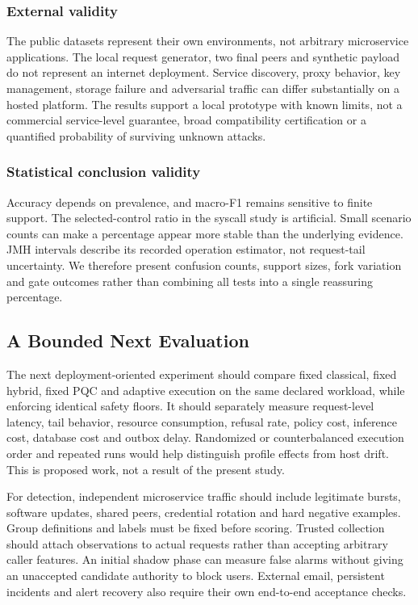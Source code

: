 \documentclass[conference,a4paper]{IEEEtran}
\begin{document}
\subsubsection{External validity}
The public datasets represent their own environments, not arbitrary microservice applications. The local request generator, two final peers and synthetic payload do not represent an internet deployment. Service discovery, proxy behavior, key management, storage failure and adversarial traffic can differ substantially on a hosted platform. The results support a local prototype with known limits, not a commercial service-level guarantee, broad compatibility certification or a quantified probability of surviving unknown attacks.

\subsubsection{Statistical conclusion validity}
Accuracy depends on prevalence, and macro-F1 remains sensitive to finite support. The selected-control ratio in the syscall study is artificial. Small scenario counts can make a percentage appear more stable than the underlying evidence. JMH intervals describe its recorded operation estimator, not request-tail uncertainty. We therefore present confusion counts, support sizes, fork variation and gate outcomes rather than combining all tests into a single reassuring percentage.

\subsection{A Bounded Next Evaluation}
The next deployment-oriented experiment should compare fixed classical, fixed hybrid, fixed PQC and adaptive execution on the same declared workload, while enforcing identical safety floors. It should separately measure request-level latency, tail behavior, resource consumption, refusal rate, policy cost, inference cost, database cost and outbox delay. Randomized or counterbalanced execution order and repeated runs would help distinguish profile effects from host drift. This is proposed work, not a result of the present study.

For detection, independent microservice traffic should include legitimate bursts, software updates, shared peers, credential rotation and hard negative examples. Group definitions and labels must be fixed before scoring. Trusted collection should attach observations to actual requests rather than accepting arbitrary caller features. An initial shadow phase can measure false alarms without giving an unaccepted candidate authority to block users. External email, persistent incidents and alert recovery also require their own end-to-end acceptance checks.
\end{document}
